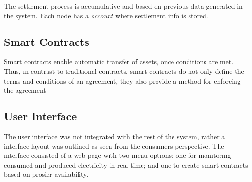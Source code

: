 The settlement process is accumulative and based on previous data generated in the system. Each node has a \textit{account} where settlement info is stored. 

\subsection{Smart Contracts}
Smart contracts enable automatic transfer of assets, once conditions are met. Thus, in contrast to traditional contracts, smart contracts do not only define the terms and conditions of an agreement, they also provide a method for enforcing the agreement.

\subsection{User Interface}
The user interface was not integrated with the rest of the system, rather a interface layout was outlined as seen from the consumers perspective. The interface consisted of a web page with two menu options: one for monitoring consumed and produced electricity in real-time; and one to create smart contracts based on prosier availability.

